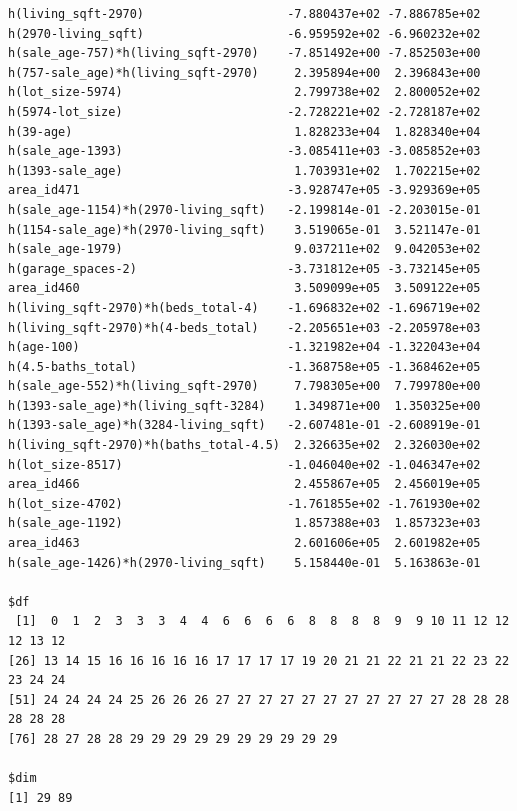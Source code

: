 \documentclass[
]{article}
\begin{document}
\begin{verbatim}
h(living_sqft-2970)                    -7.880437e+02 -7.886785e+02
h(2970-living_sqft)                    -6.959592e+02 -6.960232e+02
h(sale_age-757)*h(living_sqft-2970)    -7.851492e+00 -7.852503e+00
h(757-sale_age)*h(living_sqft-2970)     2.395894e+00  2.396843e+00
h(lot_size-5974)                        2.799738e+02  2.800052e+02
h(5974-lot_size)                       -2.728221e+02 -2.728187e+02
h(39-age)                               1.828233e+04  1.828340e+04
h(sale_age-1393)                       -3.085411e+03 -3.085852e+03
h(1393-sale_age)                        1.703931e+02  1.702215e+02
area_id471                             -3.928747e+05 -3.929369e+05
h(sale_age-1154)*h(2970-living_sqft)   -2.199814e-01 -2.203015e-01
h(1154-sale_age)*h(2970-living_sqft)    3.519065e-01  3.521147e-01
h(sale_age-1979)                        9.037211e+02  9.042053e+02
h(garage_spaces-2)                     -3.731812e+05 -3.732145e+05
area_id460                              3.509099e+05  3.509122e+05
h(living_sqft-2970)*h(beds_total-4)    -1.696832e+02 -1.696719e+02
h(living_sqft-2970)*h(4-beds_total)    -2.205651e+03 -2.205978e+03
h(age-100)                             -1.321982e+04 -1.322043e+04
h(4.5-baths_total)                     -1.368758e+05 -1.368462e+05
h(sale_age-552)*h(living_sqft-2970)     7.798305e+00  7.799780e+00
h(1393-sale_age)*h(living_sqft-3284)    1.349871e+00  1.350325e+00
h(1393-sale_age)*h(3284-living_sqft)   -2.607481e-01 -2.608919e-01
h(living_sqft-2970)*h(baths_total-4.5)  2.326635e+02  2.326030e+02
h(lot_size-8517)                       -1.046040e+02 -1.046347e+02
area_id466                              2.455867e+05  2.456019e+05
h(lot_size-4702)                       -1.761855e+02 -1.761930e+02
h(sale_age-1192)                        1.857388e+03  1.857323e+03
area_id463                              2.601606e+05  2.601982e+05
h(sale_age-1426)*h(2970-living_sqft)    5.158440e-01  5.163863e-01

$df
 [1]  0  1  2  3  3  3  4  4  6  6  6  6  8  8  8  8  9  9 10 11 12 12 12 13 12
[26] 13 14 15 16 16 16 16 16 17 17 17 17 19 20 21 21 22 21 21 22 23 22 23 24 24
[51] 24 24 24 24 25 26 26 26 27 27 27 27 27 27 27 27 27 27 27 28 28 28 28 28 28
[76] 28 27 28 28 29 29 29 29 29 29 29 29 29 29

$dim
[1] 29 89


\end{verbatim}
\end{document}
